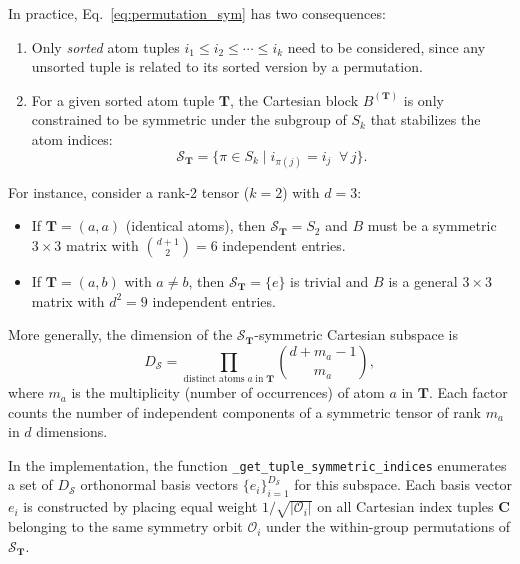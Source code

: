 \documentclass[twocolumn,amsmath,amssymb,aps,prb,10pt,floatfix]{revtex4-2}
\newcommand{\vT}{\mathbf{T}}
\newcommand{\vC}{\mathbf{C}}
\begin{document}
In practice, Eq.~\eqref{eq:permutation_sym} has two consequences:
\begin{enumerate}
\item Only \emph{sorted} atom tuples $i_1 \leq i_2 \leq \cdots \leq i_k$ need to be considered, since any unsorted tuple is related to its sorted version by a permutation.
\item For a given sorted atom tuple $\vT$, the Cartesian block $B^{(\vT)}$ is only constrained to be symmetric under the subgroup of $S_k$ that stabilizes the atom indices:
\begin{equation}
\mathcal{S}_{\vT} = \bigl\{ \pi \in S_k \;\big|\; i_{\pi(j)} = i_j \;\;\forall\, j \bigr\}.
\label{eq:tuple_stabilizer}
\end{equation}
\end{enumerate}

For instance, consider a rank-2 tensor ($k=2$) with $d=3$:
\begin{itemize}
\item If $\vT = (a, a)$ (identical atoms), then $\mathcal{S}_{\vT} = S_2$ and $B$ must be a symmetric $3 \times 3$ matrix with $\binom{d+1}{2} = 6$ independent entries.
\item If $\vT = (a, b)$ with $a \neq b$, then $\mathcal{S}_{\vT} = \{e\}$ is trivial and $B$ is a general $3 \times 3$ matrix with $d^2 = 9$ independent entries.
\end{itemize}

More generally, the dimension of the $\mathcal{S}_{\vT}$-symmetric Cartesian subspace is
\begin{equation}
D_{\mathcal{S}}
= \prod_{\text{distinct atoms}\; a \;\text{in}\; \vT}
  \binom{d + m_a - 1}{m_a},
\label{eq:D_sym}
\end{equation}
where $m_a$ is the multiplicity (number of occurrences) of atom $a$ in $\vT$.
Each factor counts the number of independent components of a symmetric tensor of rank $m_a$ in $d$ dimensions.

In the implementation, the function \texttt{\_get\_tuple\_symmetric\_indices} enumerates a set of $D_{\mathcal{S}}$ orthonormal basis vectors $\{e_i\}_{i=1}^{D_\mathcal{S}}$ for this subspace.
Each basis vector $e_i$ is constructed by placing equal weight $1/\sqrt{|\mathcal{O}_i|}$ on all Cartesian index tuples $\vC$ belonging to the same symmetry orbit $\mathcal{O}_i$ under the within-group permutations of $\mathcal{S}_{\vT}$.


\end{document}
